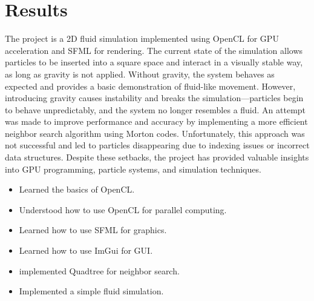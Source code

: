 \documentclass{article}
\begin{document}
\section*{Results}
The project is a 2D fluid simulation implemented using OpenCL for GPU acceleration and SFML for rendering. 
The current state of the simulation allows particles to be inserted into a square space and interact in a visually stable way, as long as gravity is not applied. 
Without gravity, the system behaves as expected and provides a basic demonstration of fluid-like movement. 
However, introducing gravity causes instability and breaks the simulation—particles begin to behave unpredictably, and the system no longer resembles a fluid. 
An attempt was made to improve performance and accuracy by implementing a more efficient neighbor search algorithm using Morton codes. 
Unfortunately, this approach was not successful and led to particles disappearing due to indexing issues or incorrect data structures. 
Despite these setbacks, the project has provided valuable insights into GPU programming, particle systems, and simulation techniques.

\begin{itemize}
    \item Learned the basics of OpenCL.
    \item Understood how to use OpenCL for parallel computing.
    \item Learned how to use SFML for graphics.
    \item Learned how to use ImGui for GUI.
    \item implemented Quadtree for neighbor search.
    \item Implemented a simple fluid simulation.
\end{itemize}
\end{document}
